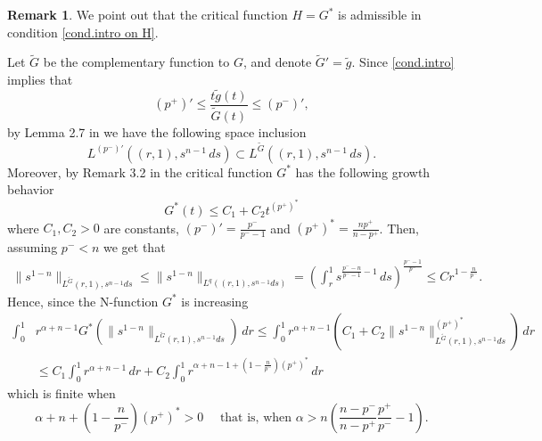 \documentclass[leqno,twoside, 12pt]{amsart}
\theoremstyle{plain}
\numberwithin{equation}{section} \numberwithin{figure}{section}
\theoremstyle{definition}
\newtheorem{remark}[theorem]{Remark}
\numberwithin{equation}{section}
\begin{document}
\begin{remark}
We point out that the critical function $H=G^*$ is admissible in condition \eqref{cond.intro on H}.

Let $\widetilde G$ be the complementary function to $G$, and denote $\widetilde G'=\widetilde g$. Since \eqref{cond.intro} implies that
$$
(p^+)' \leq \frac{t \widetilde g(t)}{\widetilde G(t)}\leq (p^-)',
$$
by Lemma 2.7 in \cite{FBPLS} we have the following space inclusion
$$
L^{(p^-)'}((r,1), s^{n-1}\,ds) \subset L^{\widetilde G}((r,1), s^{n-1}\,ds).
$$
Moreover, by Remark 3.2 in \cite{FBSi} the critical function $G^*$ has the following growth behavior
$$
G^*(t) \leq C_1 + C_2 t^{(p^+)^*}
$$
where $C_1,C_2>0$ are constants, 
$(p^-)' = \frac{p^-}{p^--1}$ and  $(p^+)^* = \frac{np^+}{n-p^+}$. Then, assuming $p^-<n$ we get that
\begin{align*}
\|s^{1-n}\|_{L^{\widetilde G}(r,1),s^{n-1}ds} \leq \|s^{1-n}\|_{L^q((r,1),s^{n-1}ds)} =\left(\int_r^1 s^{\frac{p^--n}{p^--1}-1} \,ds\right)^\frac{p^--1}{p^-} \leq C r^{1-\frac{n}{p^-}}.
\end{align*}
Hence, since the N-function $G^*$ is increasing
\begin{align*}
\int_0^1 &r^{\alpha+n-1} G^*( \|s^{1-n}\|_{L^{\widetilde G}(r,1),s^{n-1}ds} ) \,dr \leq \int_0^1 r^{\alpha+n-1}\left(C_1 + C_2 \|s^{1-n}\|_{L^{\widetilde G}(r,1),s^{n-1}ds}^{(p^+)^*}\right)\,dr\\
&\leq
C_1\int_0^1 r^{\alpha+n-1}\,dr + C_2 \int_0^1 r^{\alpha+n-1+(1-\frac{n}{p^-})(p^+)^*}\,dr 
\end{align*}
which is finite when
$$
\alpha+n+(1-\frac{n}{p^-})(p^+)^*>0 \quad \text{ that is, when }  \alpha   >n\left( \frac{n-p^-}{n-p^+} \frac{p^+}{p^-}-1  \right) .
$$
%
%

\end{remark}
\end{document}
